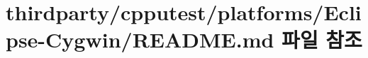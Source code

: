 \hypertarget{thirdparty_2cpputest_2platforms_2_eclipse-_cygwin_2_r_e_a_d_m_e_8md}{}\section{thirdparty/cpputest/platforms/\+Eclipse-\/\+Cygwin/\+R\+E\+A\+D\+ME.md 파일 참조}
\label{thirdparty_2cpputest_2platforms_2_eclipse-_cygwin_2_r_e_a_d_m_e_8md}
